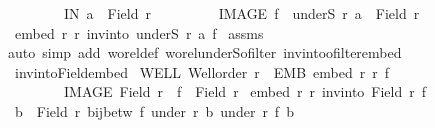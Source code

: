 \begin{isabellebody}
\ \ \ \ \ \ \ \ IN{\isacharcolon}{\kern0pt}\ {\isachardoublequoteopen}a\ {\isasymin}\ Field\ r{\isachardoublequoteclose}\ \isanewline
\ \ \ \ \ \ \ \ IMAGE{\isacharcolon}{\kern0pt}\ {\isachardoublequoteopen}f\ {\isacharbackquote}{\kern0pt}\ {\isacharparenleft}{\kern0pt}underS\ r\ a{\isacharparenright}{\kern0pt}\ {\isacharequal}{\kern0pt}\ Field\ r{\isacharprime}{\kern0pt}{\isachardoublequoteclose}\isanewline
{}\ {\isachardoublequoteopen}embed\ r{\isacharprime}{\kern0pt}\ r\ {\isacharparenleft}{\kern0pt}inv{\isacharunderscore}{\kern0pt}into\ {\isacharparenleft}{\kern0pt}underS\ r\ a{\isacharparenright}{\kern0pt}\ f{\isacharparenright}{\kern0pt}{\isachardoublequoteclose}\isanewline
%
\isadelimproof
%
\endisadelimproof
%
\isatagproof
{}\isamarkupfalse%
\ assms\isanewline
{}\isamarkupfalse%
{\isacharparenleft}{\kern0pt}auto\ simp\ add{\isacharcolon}{\kern0pt}\ wo{\isacharunderscore}{\kern0pt}rel{\isacharunderscore}{\kern0pt}def\ wo{\isacharunderscore}{\kern0pt}rel{\isachardot}{\kern0pt}underS{\isacharunderscore}{\kern0pt}ofilter\ inv{\isacharunderscore}{\kern0pt}into{\isacharunderscore}{\kern0pt}ofilter{\isacharunderscore}{\kern0pt}embed{\isacharparenright}{\kern0pt}%
\endisatagproof
{\isafoldproof}%
%
\isadelimproof
\isanewline
%
\endisadelimproof
\isanewline
{}\isamarkupfalse%
\ inv{\isacharunderscore}{\kern0pt}into{\isacharunderscore}{\kern0pt}Field{\isacharunderscore}{\kern0pt}embed{\isacharcolon}{\kern0pt}\isanewline
{}\ WELL{\isacharcolon}{\kern0pt}\ {\isachardoublequoteopen}Well{\isacharunderscore}{\kern0pt}order\ r{\isachardoublequoteclose}\ \ EMB{\isacharcolon}{\kern0pt}\ {\isachardoublequoteopen}embed\ r\ r{\isacharprime}{\kern0pt}\ f{\isachardoublequoteclose}\ \isanewline
\ \ \ \ \ \ \ \ IMAGE{\isacharcolon}{\kern0pt}\ {\isachardoublequoteopen}Field\ r{\isacharprime}{\kern0pt}\ {\isasymle}\ f\ {\isacharbackquote}{\kern0pt}\ {\isacharparenleft}{\kern0pt}Field\ r{\isacharparenright}{\kern0pt}{\isachardoublequoteclose}\isanewline
{}\ {\isachardoublequoteopen}embed\ r{\isacharprime}{\kern0pt}\ r\ {\isacharparenleft}{\kern0pt}inv{\isacharunderscore}{\kern0pt}into\ {\isacharparenleft}{\kern0pt}Field\ r{\isacharparenright}{\kern0pt}\ f{\isacharparenright}{\kern0pt}{\isachardoublequoteclose}\isanewline
%
\isadelimproof
%
\endisadelimproof
%
\isatagproof
{}\isamarkupfalse%
{\isacharminus}{\kern0pt}\isanewline
\ \ \isamarkupfalse%
\ {\isachardoublequoteopen}{\isacharparenleft}{\kern0pt}{\isasymforall}b\ {\isasymin}\ Field\ r{\isachardot}{\kern0pt}\ bij{\isacharunderscore}{\kern0pt}betw\ f\ {\isacharparenleft}{\kern0pt}under\ r\ b{\isacharparenright}{\kern0pt}\ {\isacharparenleft}{\kern0pt}under\ r{\isacharprime}{\kern0pt}\ {\isacharparenleft}{\kern0pt}f\ b{\isacharparenright}{\kern0pt}{\isacharparenright}{\kern0pt}{\isacharparenright}{\kern0pt}{\isachardoublequoteclose}\isanewline

\end{isabellebody}
